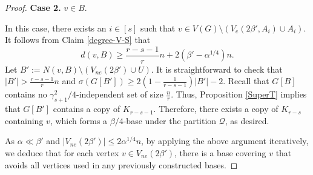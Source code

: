\documentclass[11pt, a4paper]{article}
\theoremstyle{definition}
\newcommand{\<}{\subseteq}
\begin{document}
\begin{proof}




\medskip
\textbf{ Case 2.} $v\in B$. %
\medskip %


In this case, there exists an $i\in [s]$ such that  $v\in V(G)\setminus (V_{e}(2\beta',A_i)\cup A_i)$. It follows from Claim \ref{degree-V-S} that %
$$d(v,B)\ge \frac{r-s-1}{r}n+2(\beta'-\alpha^{1/4})n.$$ 
Let $B':= N(v, B)\setminus (V_{ne}(2\beta')\cup U)$. It is straightforward to check that $|B'|>\frac{r-s-1}{r}n$ and $\sigma(G[B'])\ge 2(1-\frac{1}{r-s-1})|B'|-2$. Recall that $G[B]$ contains  no $\gamma_{s+1}^2/4$-independent set of size $\frac{n}{r}$. 
Thus, Proposition \ref{SuperT} implies that $G[B']$ contains a copy of $K_{r-s-1}$. Therefore, there exists a copy of $K_{r-s}$ containing $v$, which forms a $\beta/4$-base under  the partition $\mathcal{Q}$, as desired. %

\medskip
As $\alpha\ll \beta'$ and $|V_{ne}(2\beta')|\leq 2\alpha^{1/4}n$, by applying the above argument iteratively, we deduce that for each vertex $v\in V_{ne}(2\beta')$, there is a base covering $v$ that avoids all vertices used in any previously constructed bases.
\end{proof}%
\end{document}
